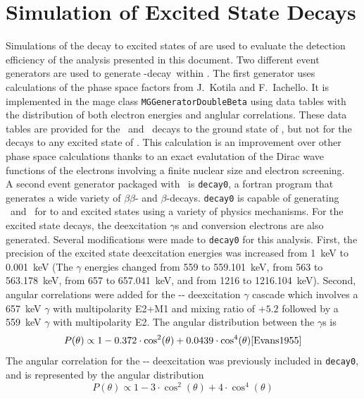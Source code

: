 \documentclass[/main.tex]{subfiles}
\begin{document}
\section{Simulation of Excited State Decays} \label{sec:essims}
Simulations of the  decay to excited states of  are used to evaluate the detection efficiency of the analysis presented in this document.
Two different event generators are used to generate  \bb-decay\ within \Mage.
The first generator uses calculations of the phase space factors from J.~Kotila and F.~Iachello\cite{Kotila2012}.
It is implemented in the mage class \texttt{MGGeneratorDoubleBeta} using data tables with the distribution of both electron energies and anglular correlations.
These data tables are provided for the \tnbb\ and \znbb\ decays to the ground state of , but not for the decays to any excited state of .
This calculation is an improvement over other phase space calculations thanks to an exact evalutation of the Dirac wave functions of the electrons involving a finite nuclear size and electron screening.
\\
A second event generator packaged with \Mage\ is \texttt{decay0}\cite{Ponkratenko2000}, a fortran program that generates a wide variety of $\beta\beta$- and $\beta$-decays.
\texttt{decay0} is capable of generating \tnbb\ and \znbb\ for  to   and  excited states using a variety of physics mechanisms.
For the excited state decays, the deexcitation $\gamma$s and conversion electrons are also generated.
Several modifications were made to \texttt{decay0} for this analysis.
First, the precision of the excited state deexcitation energies was increased from 1~keV to 0.001~keV (The $\gamma$ energies changed from 559 to 559.101~keV, from 563 to 563.178~keV, from 657 to 657.041~keV, and from 1216 to 1216.104~keV).
Second, angular correlations were added for the -- deexcitation $\gamma$ cascade which involves a 657~keV $\gamma$ with multipolarity E2+M1 and mixing ratio of $+5.2$ followed by a 559~keV $\gamma$ with multipolarity E2\cite{SINGH1995}.
The angular distribution between the $\gamma$s is
\begin{equation}
  P(\theta)\propto 1-0.372\cdot\cos^2(\theta)+0.0439\cdot\cos^4(\theta)\cite{Evans1955}
\end{equation}
The angular correlation for the -- deexcitation was previously included in \texttt{decay0}, and is represented by the angular distribution
\begin{equation}
  P(\theta)\propto 1-3\cdot\cos^2(\theta)+4\cdot\cos^4(\theta)
\end{equation}
\end{document}
